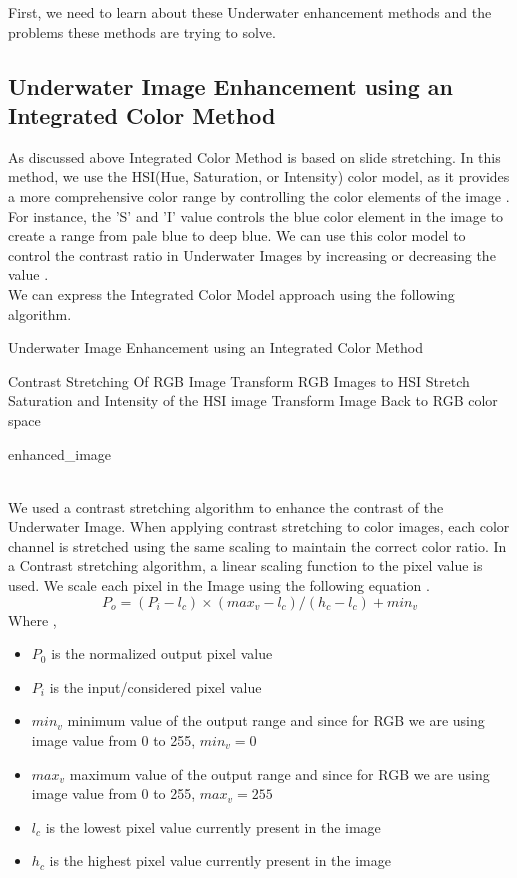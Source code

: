 \documentclass[a4paper,11pt,oneside]{article}
\begin{document}
  First, we need to learn about these Underwater enhancement methods and the problems these methods are trying to solve.
  \subsection{Underwater Image Enhancement using an Integrated Color Method \cite{4}}
  As discussed above Integrated Color Method is based on slide stretching. In this method, we use the HSI(Hue, Saturation, or Intensity) color model, as it provides a more comprehensive color range by controlling the color elements of the image \cite{4}. For instance, the 'S' and 'I' value controls the blue color element in the image to create a range from pale blue to deep blue. We can use this color model to control the contrast ratio in Underwater Images by increasing or decreasing the value \cite{4}.\\
We can express the Integrated Color Model approach using the following algorithm.
  \begin{algorithm}
	\caption*{Underwater Image Enhancement using an Integrated Color Method \cite{4}}
	\begin{algorithmic}

    \State Contrast Stretching Of RGB Image
    \State Transform RGB Images to HSI 
    \State Stretch Saturation and Intensity of the HSI image  
    \State Transform Image Back to RGB color space
    \State
    
    \Return enhanced\_image
\EndProcedure

\end{algorithmic}
\end{algorithm}\\
We used a contrast stretching algorithm to enhance the contrast of the Underwater Image. When applying contrast stretching to color images, each color channel is stretched using the same scaling to maintain the correct color ratio. In a Contrast stretching algorithm, a linear scaling function to the pixel value is used. We scale each pixel in the Image using the following equation \cite{4}.
$$P_{o} = (P_{i} - l_c) \times (max_v - l_c)  / (h_c - l_c) + min_v$$
Where \cite{4},
\begin{itemize}
\item
$P_{0}$ is the normalized output pixel value
\item
$P_{i}$ is the input/considered pixel value
\item
$min_v$  minimum value of the output range and since for RGB we are using image value from 0 to 255, $min_v = 0$
\item
$max_v$ maximum value of the output range and since for RGB we are using image value from 0 to 255, $max_v = 255$
\item
$l_c$ is the lowest pixel value currently present in the image
\item
$h_c$ is the highest pixel value currently present in the image 
\end{itemize}
\end{document}

